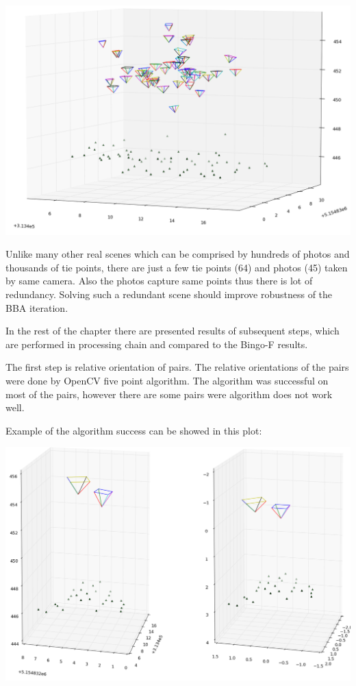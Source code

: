 \documentclass[a4paper,12pt]{article}
\begin{document}
\includegraphics[scale=0.4]{figures/bingo_result.png}

Unlike many other real scenes which can be comprised by hundreds of photos and thousands of tie points,   
there are just a few tie points (64) and photos (45) taken by same camera. Also the photos capture same points thus there 
is lot of redundancy. Solving such a redundant scene should improve robustness of the BBA iteration. 

In the rest of the chapter there are presented results of subsequent steps, which are performed in processing chain and compared 
to the Bingo-F results.

The first step is relative orientation of pairs. The relative orientations of the pairs were done by OpenCV five point algorithm.
The algorithm was successful on most of the pairs, however there are some pairs were algorithm does not work well.

Example of the algorithm success can be showed in this plot:


\includegraphics[scale=0.4]{figures/rel_or_576_598.png}
\end{document}
